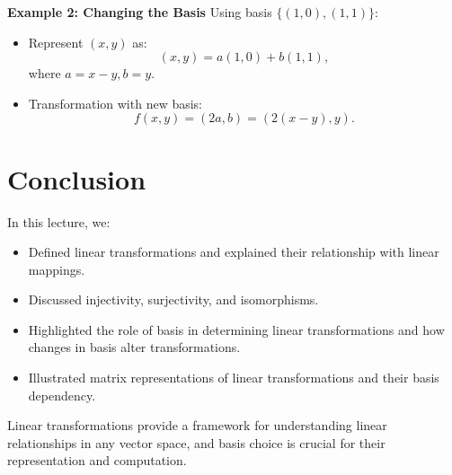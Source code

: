 \documentclass{article}
\begin{document}
\textbf{Example 2: Changing the Basis}
Using basis $\{(1, 0), (1, 1)\}$:
\begin{itemize}
  \item Represent $(x, y)$ as:
    \[
      (x, y) = a(1, 0) + b(1, 1),
    \]
    where $a = x - y, b = y$.
  \item Transformation with new basis:
    \[
      f(x, y) = (2a, b) = (2(x - y), y).
    \]
\end{itemize}

\section*{Conclusion}

In this lecture, we:
\begin{itemize}
  \item Defined linear transformations and explained their relationship with linear mappings.
  \item Discussed injectivity, surjectivity, and isomorphisms.
  \item Highlighted the role of basis in determining linear transformations and how changes in basis alter transformations.
  \item Illustrated matrix representations of linear transformations and their basis dependency.
\end{itemize}

Linear transformations provide a framework for understanding linear relationships in any vector space, and basis choice is crucial for their representation and computation.
\end{document}

